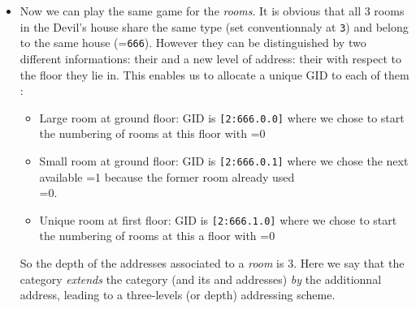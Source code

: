 \begin{itemize}
\item  Now we  can play  the  same game  for the  \emph{rooms}. It  is
  obvious that  all 3 rooms in  the Devil's house share  the same type
  (set  conventionnaly at \texttt{3})  and belong to the  same house
  (=\texttt{666}).     However     they    can    be
  distinguished     by    two     different     informations:    their
     and    a   new   level    of   address:   their
    with  respect to  the  floor  they  lie in.  This
  enables us to allocate a unique GID to each of them :
  \begin{itemize}
 
  \item Large room at ground floor: GID is \verb+[2:666.0.0]+ where we
    chose  to  start  the  numbering  of  rooms  at  this  floor  with
    =0
 
  \item Small room at ground floor: GID is \verb+[2:666.0.1]+ where we
    chose  the next available  =1 because  the former
    room already used \\ =0.

  \item Unique  room at first floor: GID  is \verb+[2:666.1.0]+ where
    we chose  to start  the numbering  of rooms at  this a  floor with
    =0

  \end{itemize}
So the depth of the addresses  associated to a \emph{room} is 3.  Here
we  say  that the    category  \emph{extends} the  
category (and its  and  addresses)
\emph{by}  the additionnal   address,  leading  to a
three-levels (or depth) addressing scheme.


\end{itemize}
